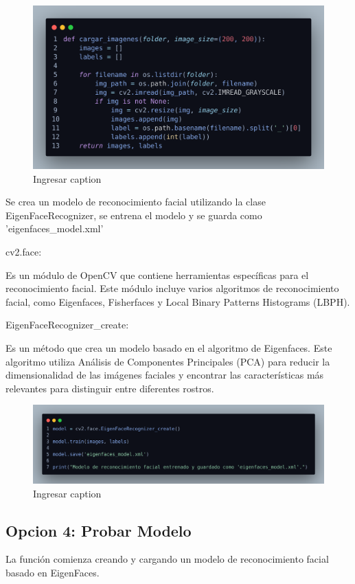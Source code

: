 \documentclass[12pt]{article}
\begin{document}
{\begin{figure}[h]
    \centering
    \includegraphics[width=0.85\linewidth]{imagenes/des19.png}
    \caption{Ingresar caption}
    \label{fig:enter-label}
\end{figure}

Se crea un modelo de reconocimiento facial utilizando la clase EigenFaceRecognizer, se entrena el modelo y se guarda como 'eigenfaces\_model.xml'

\begin{itemize}
    {\bfseries\item cv2.face:} Es un módulo de OpenCV que contiene herramientas específicas para el reconocimiento facial. Este módulo incluye varios algoritmos de reconocimiento facial, como Eigenfaces, Fisherfaces y Local Binary Patterns Histograms (LBPH). 
    {\bfseries\item EigenFaceRecognizer\_create:} Es un método que crea un modelo basado en el algoritmo de Eigenfaces. Este algoritmo utiliza Análisis de Componentes Principales (PCA) para reducir la dimensionalidad de las imágenes faciales y encontrar las características más relevantes para distinguir entre diferentes rostros.
\end{itemize}

\begin{figure}[h]
    \centering
    \includegraphics[width=1.0\linewidth]{imagenes/des20.png}
    \caption{Ingresar caption}
    \label{fig:enter-label}
\end{figure}

\subsection{Opcion 4: Probar Modelo}
La función comienza creando y cargando un modelo de reconocimiento facial basado en EigenFaces.

}
\end{document}
